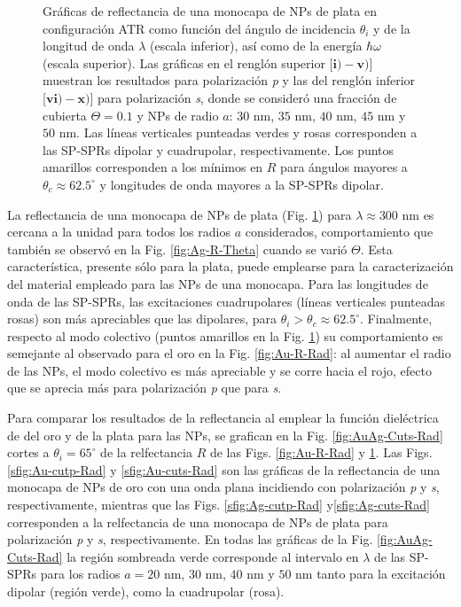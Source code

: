\begin{figure}[h!]
\vspace*{-.5em}
	\caption{Gráficas de reflectancia de una monocapa de NPs de plata en configuración ATR como función del ángulo de incidencia $\theta_i$ y de la longitud de onda $\lambda$ (escala inferior), así como de la energía  $\hbar\omega$ (escala superior).  Las gráficas   en el renglón superior [$\mathbf{i)-v)}$] muestran los resultados para  polarización \emph{p} y las del renglón inferior  [$\mathbf{vi)-x)}$]  para polarización  \emph{s}, donde se consideró una fracción de cubierta $\Theta = 0.1$ y  NPs de radio  $a$: $30$ nm, $35$ nm, $40$ nm, $45$ nm y $50$ nm.  Las líneas verticales punteadas verdes y rosas corresponden a las SP-SPRs dipolar y  cuadrupolar, respectivamente.  Los puntos amarillos corresponden a los mínimos en $R$ para ángulos mayores a $\theta_c\approx 62.5^\circ$ y longitudes de onda mayores a la SP-SPRs dipolar.
}	\label{fig:Ag-R-Rad}	
	\end{figure}	

La reflectancia de una monocapa de NPs de plata (Fig. \ref{fig:Ag-R-Rad}) para $\lambda\approx 300$ nm es cercana a la unidad para todos los radios $a$ considerados, comportamiento que también se observó en la Fig. \ref{fig:Ag-R-Theta} cuando se varió $\Theta$. Esta característica, presente sólo para la plata, puede emplearse para la caracterización del material empleado para las NPs de una monocapa. Para las longitudes de onda de las SP-SPRs, las excitaciones cuadrupolares (líneas verticales punteadas rosas) son más apreciables que las dipolares, para $\theta_i>\theta_c\approx 62.5^\circ$. Finalmente, respecto al  modo colectivo (puntos amarillos en la Fig. \ref{fig:Ag-R-Rad}) su comportamiento es semejante al observado para el oro en la Fig. \ref{fig:Au-R-Rad}: al aumentar el radio de las NPs, el modo colectivo es más apreciable y se corre hacia el rojo, efecto que se aprecia más para polarización \emph{p} que para \emph{s}.

Para comparar los resultados de la reflectancia al emplear la función dieléctrica de del oro y de la plata para las NPs, se grafican en la Fig. \ref{fig:AuAg-Cuts-Rad} cortes a $\theta_i = 65^\circ$ de la relfectancia $R$ de las Figs. \ref{fig:Au-R-Rad} y \ref{fig:Ag-R-Rad}. Las Figs. \ref{sfig:Au-cutp-Rad} y \ref{sfig:Au-cuts-Rad} son las gráficas de la reflectancia de una monocapa de NPs de oro con una onda plana incidiendo con polarización \emph{p} y \emph{s}, respectivamente, mientras que las Figs.  \ref{sfig:Ag-cutp-Rad} y\ref{sfig:Ag-cuts-Rad}  corresponden a la relfectancia de una monocapa de NPs de plata para polarización \emph{p} y \emph{s}, respectivamente. En todas las gráficas de la Fig. \ref{fig:AuAg-Cuts-Rad} la región sombreada verde corresponde al intervalo en $\lambda$ de las SP-SPRs para los radios $a=20$ nm, $30$ nm, $40$ nm y $50$ nm tanto para la excitación dipolar (región verde), como la cuadrupolar (rosa). 

